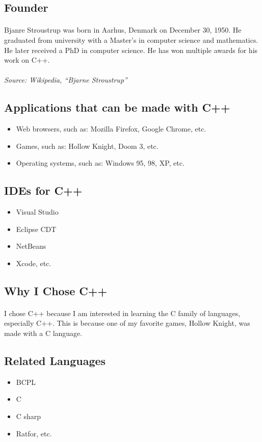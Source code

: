 \documentclass{article}
\begin{document}
\subsection*{Founder}
\paragraph{}Bjanre Stroustrup was born in Aarhus, Denmark on December 30, 1950.
He graduated from university with a Master’s in computer science and mathematics. He later received a PhD in computer science.
He has won multiple awards for his work on C++.
\paragraph{}\textit{Source: Wikipedia, “Bjarne Stroustrup”}
\subsection*{Applications that can be made with C++}
\begin{itemize}
	\item Web browsers, such as: Mozilla Firefox, Google Chrome, etc.
	\item Games, such as: Hollow Knight, Doom 3, etc.
	\item Operating systems, such as: Windows 95, 98, XP, etc.
\end{itemize}
\subsection*{IDEs for C++}
\begin{itemize}
	\item Visual Studio
	\item Eclipse CDT
	\item NetBeans
	\item Xcode, etc.
\end{itemize}
\subsection*{Why I Chose C++}
\paragraph{}I chose C++ because I am interested in learning the C family of languages, especially C++.
This is because one of my favorite games, Hollow Knight, was made with a C language.
\subsection*{Related Languages}
\begin{itemize}
	\item BCPL
	\item C
	\item C sharp
	\item Ratfor, etc.
\end{itemize}
\end{document}
